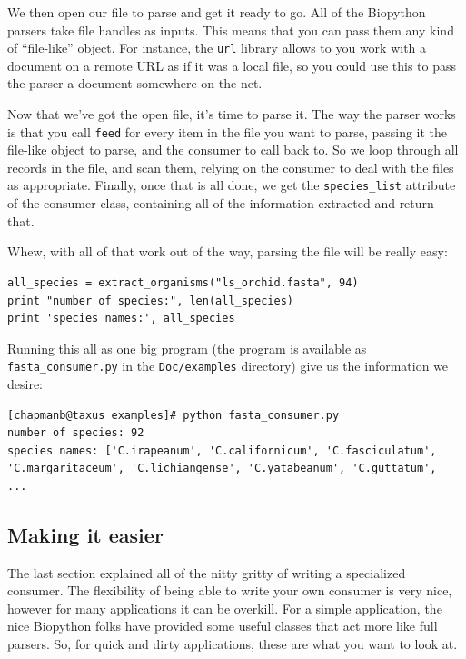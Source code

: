 \documentclass{report}
\begin{document}
We then open our file to parse and get it ready to go. All of the Biopython parsers take file handles as inputs. This means that you can pass them any kind of ``file-like'' object. For instance, the \verb|url| library allows to you work with a document on a remote URL as if it was a local file, so you could use this to pass the parser a document somewhere on the net.


Now that we've got the open file, it's time to parse it. The way the parser works is that you call \verb|feed| for every item in the file you want to parse, passing it the file-like object to parse, and the consumer to call back to. So we loop through all records in the file, and scan them, relying on the consumer to deal with the files as appropriate. Finally, once that is all done, we get the \verb|species_list| attribute of the consumer class, containing all of the information extracted and return that.


Whew, with all of that work out of the way, parsing the file will be really easy:

\begin{verbatim}
all_species = extract_organisms("ls_orchid.fasta", 94)
print "number of species:", len(all_species)
print 'species names:', all_species
\end{verbatim}

Running this all as one big program (the program is available as \verb|fasta_consumer.py| in the \verb|Doc/examples| directory) give us the information we desire:

\begin{verbatim}
[chapmanb@taxus examples]# python fasta_consumer.py
number of species: 92
species names: ['C.irapeanum', 'C.californicum', 'C.fasciculatum', 
'C.margaritaceum', 'C.lichiangense', 'C.yatabeanum', 'C.guttatum',
...
\end{verbatim}

\subsection{Making it easier}

The last section explained all of the nitty gritty of writing a specialized consumer. The flexibility of being able to write your own consumer is very nice, however for many applications it can be overkill. For a simple application, the nice Biopython folks have provided some useful classes that act more like full parsers. So, for quick and dirty applications, these are what you want to look at. 
\end{document}
